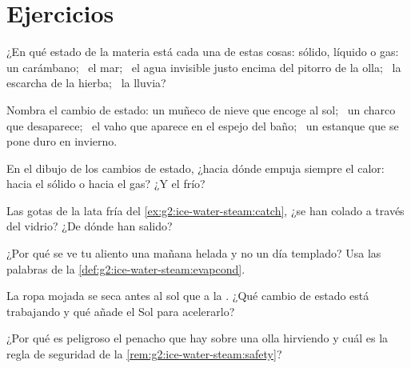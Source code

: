\section{Ejercicios}

\begin{exercise}[$\star$]\label{exo:g2:ice-water-steam:1}
¿En qué estado de la materia está cada una de estas cosas: sólido,
líquido o gas: un carámbano; \ el mar; \ el agua invisible justo
encima del pitorro de la olla; \ la escarcha de la hierba; \ la
lluvia?
\end{exercise}

\begin{exercise}[$\star$]\label{exo:g2:ice-water-steam:2}
Nombra el cambio de estado: un muñeco de nieve que encoge al sol; \ un
charco que desaparece; \ el vaho que aparece en el espejo del baño; \
un estanque que se pone duro en invierno.
\end{exercise}

\begin{exercise}[$\star$]\label{exo:g2:ice-water-steam:3}
En el dibujo de los cambios de estado, ¿hacia dónde empuja siempre el
calor: hacia el sólido o hacia el gas? ¿Y el frío?
\end{exercise}

\begin{exercise}[$\star$]\label{exo:g2:ice-water-steam:4}
Las gotas de la lata fría del \cref{ex:g2:ice-water-steam:catch}, ¿se
han colado a través del vidrio? ¿De dónde han salido?
\end{exercise}

\begin{exercise}[$\star$]\label{exo:g2:ice-water-steam:5}
¿Por qué se ve tu aliento una mañana helada y no un día templado? Usa
las palabras de la \cref{def:g2:ice-water-steam:evapcond}.
\end{exercise}

\begin{exercise}[$\star$]\label{exo:g2:ice-water-steam:6}
La ropa mojada se seca antes al sol que a la . ¿Qué cambio de
estado está trabajando y qué añade el Sol para acelerarlo?
\end{exercise}

\begin{exercise}[$\star$]\label{exo:g2:ice-water-steam:7}
¿Por qué es peligroso el penacho que hay sobre una olla hirviendo y
cuál es la regla de seguridad de la
\cref{rem:g2:ice-water-steam:safety}?
\end{exercise}


